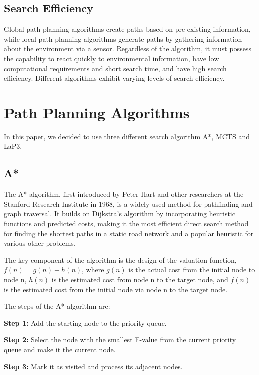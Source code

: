 \documentclass[bibliography=totoc]{scrartcl}
\begin{document}
\subsection{Search Efficiency}

Global path planning algorithms create paths based on pre-existing information, while local path planning algorithms generate paths by gathering information about the environment via a sensor.
Regardless of the algorithm, it must possess the capability to react quickly to environmental information, have low computational requirements and short search time, and have high search efficiency. Different algorithms exhibit varying levels of search efficiency.

\section{Path Planning Algorithms}
\label{path_planning_algorithm}
In this paper, we decided to use three different search algorithm A*, \ac{MCTS} and \ac{LaP3}.

\subsection{A*}
The A* algorithm, first introduced by Peter Hart and other researchers at the Stanford Research Institute in 1968, is a widely used method for pathfinding and graph traversal. \cite{4082128} It builds on Dijkstra's algorithm by incorporating heuristic functions and predicted costs, making it the most efficient direct search method for finding the shortest paths in a static road network and a popular heuristic for various other problems.\cite{ProbabilisticApproachCollaborativeMultiRobotLocalization}

The key component of the algorithm is the design of the valuation function, $f(n) = g(n) + h(n)$, where $g(n)$ is the actual cost from the initial node to node n, $h(n)$ is the estimated cost from node n to the target node, and $f(n)$ is the estimated cost from the initial node via node n to the target node.

The steps of the A* algorithm are:

\textbf{Step 1:} Add the starting node to the priority queue.

\textbf{Step 2:} Select the node with the smallest F-value from the current priority queue and make it the current node.

\textbf{Step 3:} Mark it as visited and process its adjacent nodes.
\end{document}
